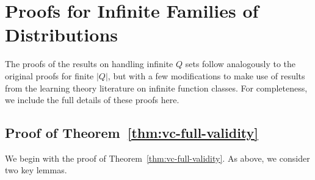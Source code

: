 


\section{Proofs for Infinite Families of Distributions}
\label{sec:vc-classes-proofs}

The proofs of the results on handling infinite $Q$ sets follow analogously 
to the original proofs for finite $|Q|$, but with a few modifications to make 
use of results from the learning theory literature on infinite function classes.
For completeness, we include the full details of these proofs here.

\subsection{Proof of Theorem~\ref{thm:vc-full-validity}}

We begin with the proof of Theorem~\ref{thm:vc-full-validity}.
As above, we consider two key lemmas.

